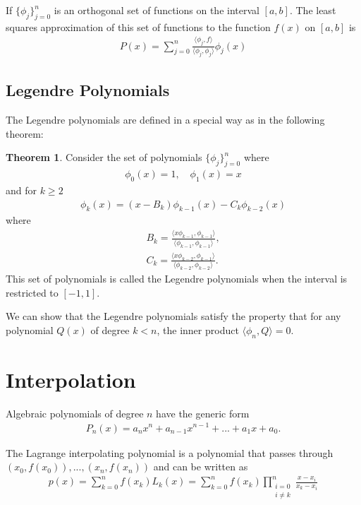 \documentclass{revtex4-2}
\theoremstyle{definition}
\newtheorem{theorem}{Theorem}
\begin{document}
If $\{\phi_j\}_{j=0}^n$ is an orthogonal set of functions on the interval $[a, b]$. The least squares approximation
of this set of functions to the function $f(x)$ on $[a, b]$ is
\begin{align}
    P(x) = \sum_{j=0}^n \frac{\langle\phi_j, f\rangle}{\langle\phi_j, \phi_j\rangle} \phi_j(x)
\end{align}

\subsection{Legendre Polynomials}

The Legendre polynomials are defined in a special way as in the following theorem:

\begin{theorem} \label{thm:legendre}
    Consider the set of polynomials $\{\phi_j\}_{j=0}^n$ where 
    \begin{align}
        \phi_0(x) = 1, \quad \phi_1(x) = x
    \end{align}
    and for $k\geq 2$
    \begin{align}
        \phi_k(x) = (x - B_k)\phi_{k-1}(x) - C_k\phi_{k-2}(x)
    \end{align}
    where
    \begin{align}
        B_k = \frac{\langle x\phi_{k-1}, \phi_{k-1}\rangle}{\langle\phi_{k-1}, \phi_{k-1}\rangle}, \\
        C_k = \frac{\langle x\phi_{k-2}, \phi_{k-1}\rangle}{\langle\phi_{k-2}, \phi_{k-2}\rangle}.
    \end{align}
    This set of polynomials is called the Legendre polynomials when the interval is restricted to $[-1, 1]$.
\end{theorem}

We can show that the Legendre polynomials satisfy the property that for any polynomial $Q(x)$ of degree $k < n$,
the inner product $\langle \phi_n, Q \rangle = 0$.


\section{Interpolation}

Algebraic polynomials of degree $n$ have the generic form \cite{burden_and_faires}
\begin{align}
    P_n(x) = a_n x^n + a_{n-1} x^{n-1} + ... + a_1 x + a_0.
\end{align}

The Lagrange interpolating polynomial is a polynomial that passes through $(x_0, f(x_0)), ..., (x_n, f(x_n))$ and can
be written as
\begin{align}
    p(x) = \sum_{k=0}^n f(x_k) L_k(x) = \sum_{k=0}^n f(x_k) \prod_{\substack{i=0\\i\neq k}}^n \frac{x - x_i}{x_k - x_i}
\end{align}
\end{document}
